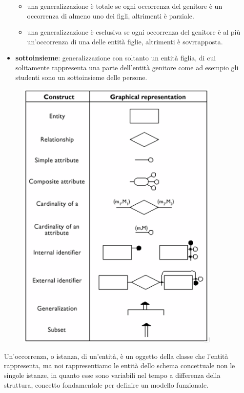 \documentclass[a4paper,12pt, oneside]{book}
\begin{document}
\begin{itemize}
          \begin{itemize}
            \item una generalizzazione è totale se ogni occorrenza del genitore è un occorrenza di almeno
                  uno dei figli, altrimenti è parziale.
            \item una generalizzazione è esclusiva se ogni occorrenza del genitore è al più un'occorrenza 
                  di una delle entità figlie, altrimenti è sovrrapposta.
          \end{itemize}
  \item \textbf{sottoinsieme}: generalizzazione con soltanto un entità figlia, di cui solitamente rappresenta una parte 
            dell'entità genitore come ad esempio gli studenti sono un sottoinsieme delle persone.
\end{itemize}

\begin{figure}
\includegraphics[scale=0.8]{img/bas6.png}
\end{figure}
Un'occorrenza, o istanza, di un'entità, è un oggetto della classe che l'entità rappresenta,
ma noi rappresentiamo le entità dello schema concettuale non le singole istanze, in quanto esse
sono variabili nel tempo a differenza della struttura, concetto fondamentale per definire un modello funzionale.
\end{document}
